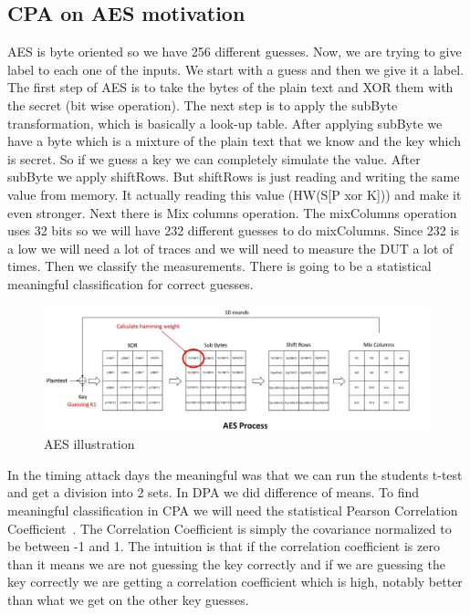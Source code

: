 \subsection{CPA on AES motivation}

AES is byte oriented so we have 256 different guesses. Now, we are trying to
give label to each one of the inputs. We start with a guess and then we give it
a label. The first step of AES is to take the bytes of the plain text and XOR
them with the secret (bit wise operation). The next step is to apply the subByte
transformation, which is basically a look-up table. After applying subByte we
have a byte which is a mixture of the plain text that we know and the key which
is secret. So if we guess a key we can completely simulate the value. After
subByte we apply shiftRows. But shiftRows is just reading and writing the same
value from memory. It actually reading this value (HW(S[P xor K])) and make it
even stronger. Next there is Mix columns operation. The mixColumns operation
uses 32 bits so we will have 232 different guesses to do mixColumns. Since 232
is a low we will need a lot of traces and we will need to measure the DUT a lot
of times. Then we classify the measurements. There is going to be a statistical
meaningful classification for correct guesses.

\begin{figure}[!ht]
    \centering
    \includegraphics[width=1.0\textwidth]{images/chapter8/aes_process.jpg}
    \caption{AES illustration} \label{c8_aes:fig}
\end{figure}

In the timing attack days the meaningful was that we can run the students t-test
and get a division into 2 sets. In DPA we did  difference of means. To find
meaningful classification in CPA we will need the statistical Pearson
Correlation Coefficient~\cite{PearsonCorrelationCoefficient}. The Correlation
Coefficient is simply the covariance normalized to be between -1 and 1. The
intuition is that if the correlation coefficient is zero than it means we are
not guessing the key correctly and if we are guessing the key correctly we are
getting a correlation coefficient which is high, notably better than what we get
on the other key guesses. 

